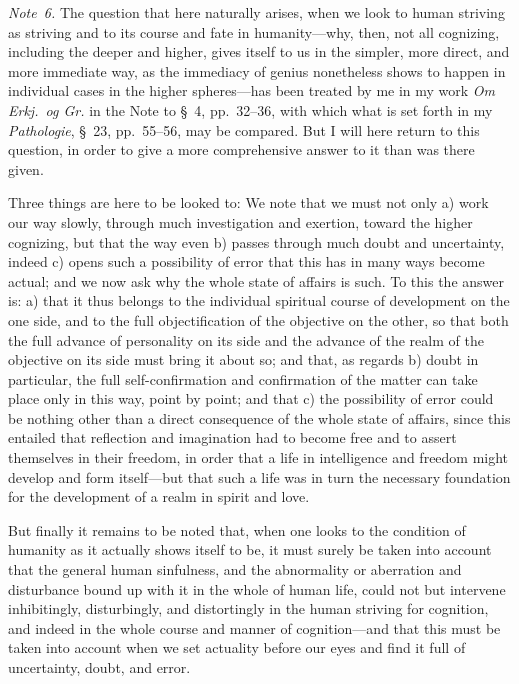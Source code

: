 \documentclass[12pt,a4paper]{book}
\begin{document}
{\small\emph{Note~6.} The question that here naturally arises, when we look to
human striving as striving and to its course and fate in humanity---why, then, not
all cognizing, including the deeper and higher, gives itself to us in the simpler,
more direct, and more immediate way, as the immediacy of genius nonetheless shows
to happen in individual cases in the higher spheres---has been treated by me in my
work \textit{Om Erkj.\ og Gr.} in the Note to \S~4, pp.~32--36, with which what is
set forth in my \textit{Pathologie}, \S~23, pp.~55--56, may be compared. But I
will here return to this question, in order to give a more comprehensive answer to
it than was there given.\par}

Three things are here to be looked to: We note that we must not only a) work our
way slowly, through much investigation and exertion, toward the higher cognizing,
but that the way even b) passes through much doubt and uncertainty, indeed c)
opens such a possibility of error that this has in many ways become actual; and we
now ask why the whole state of affairs is such. To this the answer is: a) that it
thus belongs to the individual spiritual course of development on the one side,
and to the full objectification of the objective on the other, so that both the
full advance of personality on its side and the advance of the realm of the
objective on its side must bring it about so; and that, as regards b) doubt in
particular, the full self-confirmation and confirmation of the matter can take
place only in this way, point by point; and that c) the possibility of error could
be nothing other than a direct consequence of the whole state of affairs, since
this entailed that reflection and imagination had to become free and to assert
themselves in their freedom, in order that a life in intelligence and freedom
might develop and form itself---but that such a life was in turn the necessary
foundation for the development of a realm in spirit and love.

But finally it remains to be noted that, when one looks to the condition of
humanity as it actually shows itself to be, it must surely be taken into account
that the general human sinfulness, and the abnormality or aberration and
disturbance bound up with it in the whole of human life, could not but intervene
inhibitingly, disturbingly, and distortingly in the human striving for cognition,
and indeed in the whole course and manner of cognition---and that this must be
taken into account when we set actuality before our eyes and find it full of
uncertainty, doubt, and error.
\end{document}
